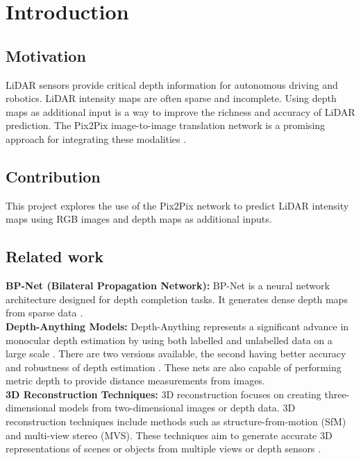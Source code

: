 \chapter{Introduction}
\label{chap:intro}

\section{Motivation}
\label{sect:motivation}
LiDAR sensors provide critical depth information for autonomous driving and robotics. LiDAR intensity maps are often sparse and incomplete. Using depth maps as additional input is a way to improve the richness and accuracy of LiDAR prediction. The Pix2Pix image-to-image translation network is a promising approach for integrating these modalities \cite{CycleGAN2017} \cite{isola2017image}.
\section{Contribution}
This project explores the use of the Pix2Pix network to predict LiDAR intensity maps using RGB images and depth maps as additional inputs.
\section{Related work}
\textbf{BP-Net (Bilateral Propagation Network):} BP-Net is a neural network architecture designed for depth completion tasks. It generates dense depth maps from sparse data \cite{BP-Net}. \\
\newline \textbf{Depth-Anything Models:}  Depth-Anything represents a significant advance in monocular depth estimation by using both labelled and unlabelled data on a large scale \cite{depthanything}. There are two versions available, the second having better accuracy and robustness of depth estimation \cite{depth_anything_v2}. These nets are also capable of performing metric depth to provide distance measurements from images.
\\ \textbf{3D Reconstruction Techniques:} 3D reconstruction focuses on creating three-dimensional models from two-dimensional images or depth data. 3D reconstruction techniques include methods such as structure-from-motion (SfM) and multi-view stereo (MVS). These techniques aim to generate accurate 3D representations of scenes or objects from multiple views or depth sensors \cite{saxena2008depth}.




